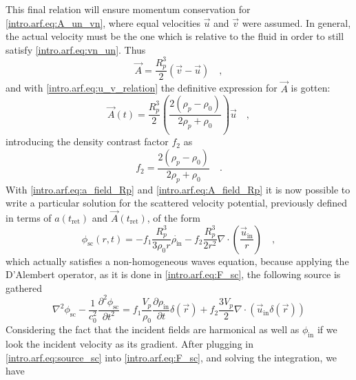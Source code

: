 This final relation will ensure momentum conservation for \eqref{intro.arf.eq:A_un_vn}, where equal velocities $\vec u$ and $\vec v$ were assumed. In general, the actual velocity must be the one which is relative to the fluid in order to still satisfy \eqref{intro.arf.eq:vn_un}. Thus
\begin{equation}
    \vec A = \frac{R_p^3}{2}(\vec v - \vec u)\quad,
\end{equation}
and with \eqref{intro.arf.eq:u_v_relation} the definitive expression for $\vec A$ is gotten:
\begin{equation}\label{intro.arf.eq:A_field_Rp}
    \vec A(t) = \frac{R_p^3}{2}\left(\frac{2(\rho_p-\rho_0)}{2\rho_p+\rho_0}\right)\vec u\quad,
\end{equation}
introducing the density contrast factor $f_2$ as
\begin{equation}\label{intro.arf.eq:f2}
    f_2 = \frac{2(\rho_p-\rho_0)}{2\rho_p+\rho_0}\quad.
\end{equation}
With \eqref{intro.arf.eq:a_field_Rp} and \eqref{intro.arf.eq:A_field_Rp} it is now possible to write a particular solution for the scattered velocity potential, previously defined in terms of $a(t_{\text{ret}})$ and $\vec A(t_{\text{ret}})$, of the form
\begin{equation}
    \phi_{\text{sc}}(r,t) = -f_1\frac{R_p^3}{3\rho_0 r}\dot{\rho_{\text{in}}} - f_2\frac{R_p^3}{2r^2}\nabla\cdot\left(\frac{\vec u_{\text{in}}}{r}\right)\quad,
\end{equation}
which actually satisfies a non-homogeneous waves equation, because applying the D'Alembert operator, as it is done in \eqref{intro.arf.eq:F_sc}, the following source is gathered
\begin{equation}\label{intro.arf.eq:source_sc}
    \nabla^2\phi_{\text{sc}} - \frac{1}{c_0^2}\frac{\partial^2\phi_{\text{sc}}}{\partial t^2} = f_1\frac{V_p}{\rho_0}\frac{\partial\rho_{\text{in}}}{\partial t}\delta(\vec r) + f_2\frac{3V_p}{2}\nabla\cdot\left(\vec u_{\text{in}}\delta(\vec r)\right)
\end{equation}
Considering the fact that the incident fields are harmonical as well as $\phi_{\text{in}}$ if we look the incident velocity as its gradient. After plugging in \eqref{intro.arf.eq:source_sc} into \eqref{intro.arf.eq:F_sc}, and solving the integration, we have
